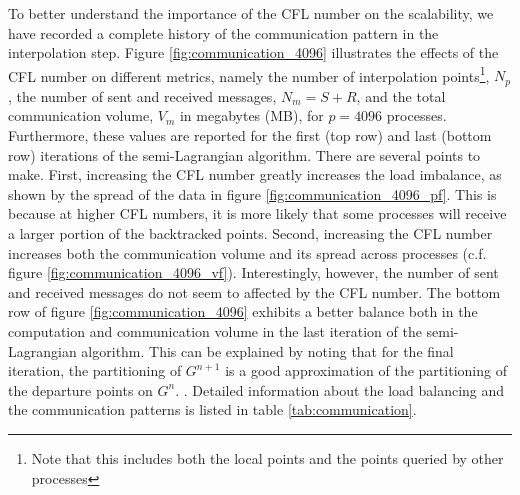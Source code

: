 To better understand the importance of the CFL number on the scalability, we have recorded a complete history of the communication pattern in the interpolation step. Figure \ref{fig:communication_4096} illustrates the effects of the CFL number on different metrics, namely the number of interpolation points\footnote{Note that this includes both the local points and the points queried by other processes}, $N_p$, the number of sent and received messages, $N_m = S + R$, and the total communication volume, $V_m$ in megabytes (MB), for $p=4096$ processes. Furthermore, these values are reported for the first (top row) and last (bottom row) iterations of the semi-Lagrangian algorithm. There are several points to make. First, increasing the CFL number greatly increases the load imbalance, as shown by the spread of the data in figure \ref{fig:communication_4096_pf}. This is because at higher CFL numbers, it is more likely that some processes will receive a larger portion of the backtracked points. Second, increasing the CFL number increases both the communication volume and its spread across processes (c.f. figure \ref{fig:communication_4096_vf}). Interestingly, however, the number of sent and received messages do not seem to affected by the CFL number. The bottom row of figure \ref{fig:communication_4096} exhibits a better balance both in the computation and communication volume in the last iteration of the semi-Lagrangian algorithm. This can be explained by noting that for the final iteration, the partitioning of $G^{n+1}$ is a good approximation of the partitioning of the departure points on $G^n$.   . Detailed information about the load balancing and the communication patterns is listed in table \ref{tab:communication}.
